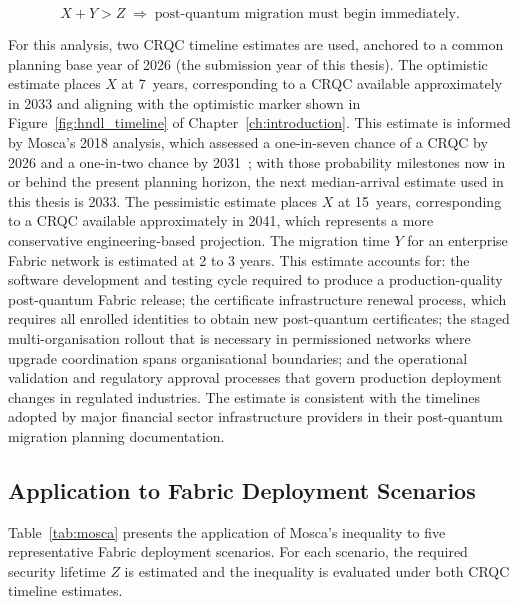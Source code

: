 \documentclass[conference]{IEEEtran}
\begin{document}
\begin{equation}
X + Y > Z \;\Longrightarrow\; \text{post-quantum migration must begin immediately.}
\label{eq:mosca}
\end{equation}

For this analysis, two CRQC timeline estimates are used, anchored to a
common planning base year of 2026 (the submission year of this
thesis). The optimistic estimate places $X$ at 7~years, corresponding
to a CRQC available approximately in 2033 and aligning with the
optimistic marker shown in Figure~\ref{fig:hndl_timeline} of
Chapter~\ref{ch:introduction}. This estimate is informed by Mosca's
2018 analysis, which assessed a one-in-seven chance of a CRQC by 2026
and a one-in-two chance by 2031~\cite{mosca2018}; with those
probability milestones now in or behind the present planning horizon,
the next median-arrival estimate used in this thesis is 2033. The
pessimistic estimate places $X$ at 15~years, corresponding to a CRQC
available approximately in 2041, which represents a more conservative
engineering-based projection. The migration time $Y$ for an enterprise Fabric network is
estimated at 2 to 3 years. This estimate accounts for: the software
development and testing cycle required to produce a production-quality
post-quantum Fabric release; the certificate infrastructure renewal
process, which requires all enrolled identities to obtain new
post-quantum certificates; the staged multi-organisation rollout that
is necessary in permissioned networks where upgrade coordination spans
organisational boundaries; and the operational validation and regulatory
approval processes that govern production deployment changes in regulated
industries. The estimate is consistent with the timelines adopted by
major financial sector infrastructure providers in their post-quantum
migration planning documentation.

\subsection{Application to Fabric Deployment Scenarios}

Table~\ref{tab:mosca} presents the application of Mosca's inequality to
five representative Fabric deployment scenarios. For each scenario, the
required security lifetime $Z$ is estimated and the inequality is
evaluated under both CRQC timeline estimates.
\end{document}
